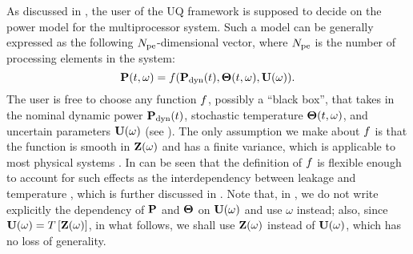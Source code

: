 As discussed in , the user of the UQ framework is supposed to decide on the power model for the multiprocessor system. Such a model can be generally expressed as the following ${N_\text{pe}}$-dimensional vector, where ${N_\text{pe}}$ is the number of processing elements in the system:
\begin{equation} \elabel{power-model}
  \vP(\t, \o) = \f(\vP_\dyn(\t), \vTO(\t, \o), \vU(\o)).
\end{equation}
The user is free to choose any function $f$, possibly a ``black box'', that takes in the nominal dynamic power $\mathbf{P}_{\text{dyn}}(t)$, stochastic temperature ${\boldsymbol\Theta}(t, \omega)$, and uncertain parameters $\mathbf{U}(\omega)$ (see ). The only assumption we make about $f$ is that the function is smooth in $\mathbf{Z}(\omega)$ and has a finite variance, which is applicable to most physical systems \cite{xiu2002}. In can be seen that the definition of $f$ is flexible enough to account for such effects as the interdependency between leakage and temperature \cite{srivastava2010, liu2007}, which is further discussed in . Note that, in , we do not write explicitly the dependency of $\mathbf{P}$ and ${\boldsymbol\Theta}$ on $\mathbf{U}(\omega)$ and use $\omega$ instead; also, since $\mathbf{U}(\omega) = T\left[\mathbf{Z}(\omega)\right]$, in what follows, we shall use $\mathbf{Z}(\omega)$ instead of $\mathbf{U}(\omega)$, which has no loss of generality.
